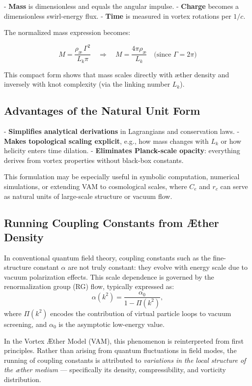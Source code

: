 - \textbf{Mass} is dimensionless and equals the angular impulse.
- \textbf{Charge} becomes a dimensionless swirl-energy flux.
- \textbf{Time} is measured in vortex rotations per \( 1/c \).

The normalized mass expression becomes:

\[
M = \frac{\rho_\text{\ae} \, \Gamma^2}{L_k \pi}
\quad \Rightarrow \quad
M = \frac{4\pi \rho_\text{\ae}}{L_k}
\quad \text{(since } \Gamma = 2\pi)
\]

This compact form shows that mass scales directly with æther density and inversely with knot complexity (via the linking number \( L_k \)).

\subsection*{Advantages of the Natural Unit Form}

- \textbf{Simplifies analytical derivations} in Lagrangians and conservation laws.
- \textbf{Makes topological scaling explicit}, e.g., how mass changes with \( L_k \) or how helicity enters time dilation.
- \textbf{Eliminates Planck-scale opacity}: everything derives from vortex properties without black-box constants.

This formulation may be especially useful in symbolic computation, numerical simulations, or extending VAM to cosmological scales, where \( C_e \) and \( r_c \) can serve as natural units of large-scale structure or vacuum flow.
\subsection{Running Coupling Constants from Æther Density}

In conventional quantum field theory, coupling constants such as the fine-structure constant \( \alpha \) are not truly constant: they evolve with energy scale due to vacuum polarization effects. This scale dependence is governed by the renormalization group (RG) flow, typically expressed as:
\begin{equation}
\alpha(k^2) = \frac{\alpha_0}{1 - \Pi(k^2)},
\end{equation}
where \( \Pi(k^2) \) encodes the contribution of virtual particle loops to vacuum screening, and \( \alpha_0 \) is the asymptotic low-energy value.

\vspace{0.5em}

In the Vortex Æther Model (VAM), this phenomenon is reinterpreted from first principles. Rather than arising from quantum fluctuations in field modes, the running of coupling constants is attributed to \emph{variations in the local structure of the æther medium} — specifically its density, compressibility, and vorticity distribution.


